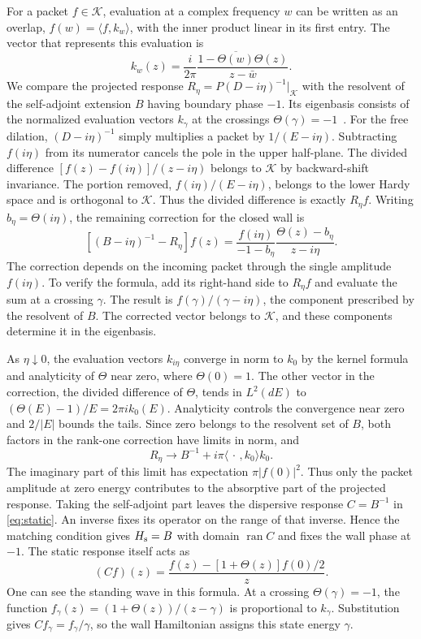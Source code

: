 \documentclass[11pt,letterpaper]{article}
\numberwithin{equation}{section}
\begin{document}
For a packet $f\in\mathcal K$, evaluation at a complex frequency $w$ can be written as an overlap, $f(w)=\langle f,k_w\rangle$, with the inner product linear in its first entry. The vector that represents this evaluation is
\[
 k_w(z)=\frac{i}{2\pi}\frac{1-\overline{\Theta(w)}\Theta(z)}{z-\bar w}.
\]
We compare the projected response $R_\eta=P(D-i\eta)^{-1}|_{\mathcal K}$ with the resolvent of the self-adjoint extension $B$ having boundary phase $-1$. Its eigenbasis consists of the normalized evaluation vectors $k_\gamma$ at the crossings $\Theta(\gamma)=-1$~\cite{suzukiglobal}. For the free dilation, $(D-i\eta)^{-1}$ simply multiplies a packet by $1/(E-i\eta)$. Subtracting $f(i\eta)$ from its numerator cancels the pole in the upper half-plane. The divided difference $[f(z)-f(i\eta)]/(z-i\eta)$ belongs to $\mathcal K$ by backward-shift invariance. The portion removed, $f(i\eta)/(E-i\eta)$, belongs to the lower Hardy space and is orthogonal to $\mathcal K$. Thus the divided difference is exactly $R_\eta f$. Writing $b_\eta=\Theta(i\eta)$, the remaining correction for the closed wall is
\[
 [(B-i\eta)^{-1}-R_\eta]f(z)=
 \frac{f(i\eta)}{-1-b_\eta}\frac{\Theta(z)-b_\eta}{z-i\eta}.
\]
The correction depends on the incoming packet through the single amplitude $f(i\eta)$. To verify the formula, add its right-hand side to $R_\eta f$ and evaluate the sum at a crossing $\gamma$. The result is $f(\gamma)/(\gamma-i\eta)$, the component prescribed by the resolvent of $B$. The corrected vector belongs to $\mathcal K$, and these components determine it in the eigenbasis.

As $\eta\downarrow0$, the evaluation vectors $k_{i\eta}$ converge in norm to $k_0$ by the kernel formula and analyticity of $\Theta$ near zero, where $\Theta(0)=1$. The other vector in the correction, the divided difference of $\Theta$, tends in $L^2(dE)$ to $(\Theta(E)-1)/E=2\pi i k_0(E)$. Analyticity controls the convergence near zero and $2/|E|$ bounds the tails. Since zero belongs to the resolvent set of $B$, both factors in the rank-one correction have limits in norm, and
\[
 R_\eta\longrightarrow B^{-1}
       +i\pi\langle\,\cdot\,,k_0\rangle k_0 .
\]
The imaginary part of this limit has expectation $\pi|f(0)|^2$. Thus only the packet amplitude at zero energy contributes to the absorptive part of the projected response. Taking the self-adjoint part leaves the dispersive response $C=B^{-1}$ in \eqref{eq:static}. An inverse fixes its operator on the range of that inverse. Hence the matching condition gives $H_{\rm s}=B$ with domain $\operatorname{ran}C$ and fixes the wall phase at $-1$. The static response itself acts as
\[
 (Cf)(z)=\frac{f(z)-[1+\Theta(z)]f(0)/2}{z}.
\]
One can see the standing wave in this formula. At a crossing $\Theta(\gamma)=-1$, the function $f_\gamma(z)=(1+\Theta(z))/(z-\gamma)$ is proportional to $k_\gamma$. Substitution gives $C f_\gamma=f_\gamma/\gamma$, so the wall Hamiltonian assigns this state energy $\gamma$.
\end{document}
